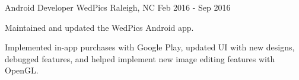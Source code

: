 \begin{cventries}
  \cventry
    {Android Developer} %
    {WedPics} %
    {Raleigh, NC} %
    {Feb 2016 - Sep 2016} %
    {
      \begin{cvitems} %
        \item {Maintained and updated the WedPics Android app.}
        \item {Implemented in-app purchases with Google Play, updated UI with new designs, debugged features, and helped implement new image editing features with OpenGL.}
      \end{cvitems}
    }

\end{cventries}
